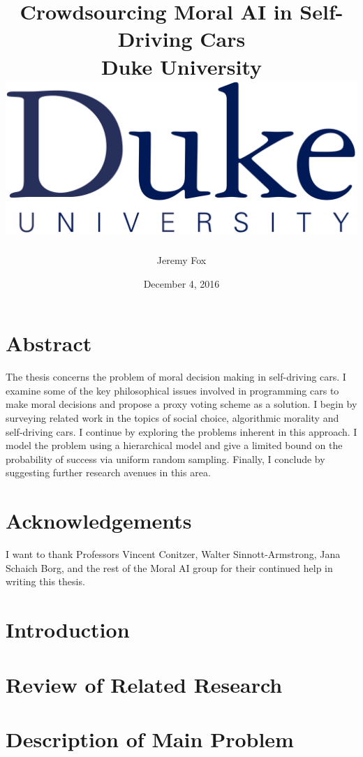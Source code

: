 \documentclass[12pt]{report}
\title{
	{Crowdsourcing Moral AI in Self-Driving Cars}\\
	{\large Duke University}\\
	{\includegraphics[width=\textwidth]{duke.png}}
}
\author{Jeremy Fox}
\date{December 4, 2016}
\begin{document}
\maketitle




\chapter*{Abstract}
The thesis concerns the problem of moral decision making in self-driving cars. I examine some of the key philosophical issues involved in programming cars to make moral decisions and propose a proxy voting scheme as a solution. I begin by surveying related work in the topics of social choice, algorithmic morality and self-driving cars. I continue by exploring the problems inherent in this approach. I model the problem using a hierarchical model and give a limited bound on the probability of success via uniform random sampling. Finally, I conclude by suggesting further research avenues in this area.

\chapter*{Acknowledgements}
I want to thank Professors Vincent Conitzer, Walter Sinnott-Armstrong, Jana Schaich Borg, and the rest of the Moral AI group for their continued help in writing this thesis.

\tableofcontents

\chapter{Introduction}


\chapter{Review of Related Research}


\chapter{Description of Main Problem}

\end{document}
